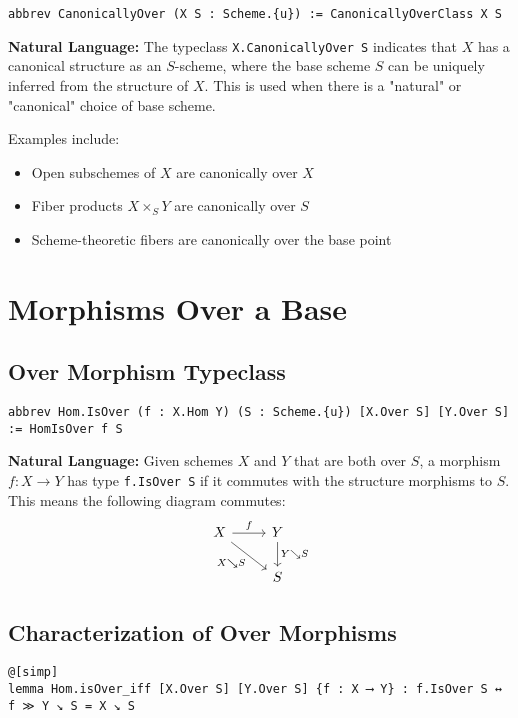 \documentclass{article}
\theoremstyle{definition}
\begin{document}
\begin{lstlisting}
abbrev CanonicallyOver (X S : Scheme.{u}) := CanonicallyOverClass X S
\end{lstlisting}

\textbf{Natural Language:} The typeclass \texttt{X.CanonicallyOver S} indicates that $X$ has a canonical structure as an $S$-scheme, where the base scheme $S$ can be uniquely inferred from the structure of $X$. This is used when there is a "natural" or "canonical" choice of base scheme.

Examples include:
\begin{itemize}
\item Open subschemes of $X$ are canonically over $X$
\item Fiber products $X \times_S Y$ are canonically over $S$
\item Scheme-theoretic fibers are canonically over the base point
\end{itemize}

\section{Morphisms Over a Base}

\subsection{Over Morphism Typeclass}

\begin{lstlisting}
abbrev Hom.IsOver (f : X.Hom Y) (S : Scheme.{u}) [X.Over S] [Y.Over S] := HomIsOver f S
\end{lstlisting}

\textbf{Natural Language:} Given schemes $X$ and $Y$ that are both over $S$, a morphism $f: X \to Y$ has type \texttt{f.IsOver S} if it commutes with the structure morphisms to $S$. This means the following diagram commutes:
\[
\begin{tikzcd}
X \arrow[r, "f"] \arrow[dr, "X \searrow S"'] & Y \arrow[d, "Y \searrow S"] \\
& S
\end{tikzcd}
\]

\subsection{Characterization of Over Morphisms}

\begin{lstlisting}
@[simp]
lemma Hom.isOver_iff [X.Over S] [Y.Over S] {f : X ⟶ Y} : f.IsOver S ↔ f ≫ Y ↘ S = X ↘ S
\end{lstlisting}
\end{document}
